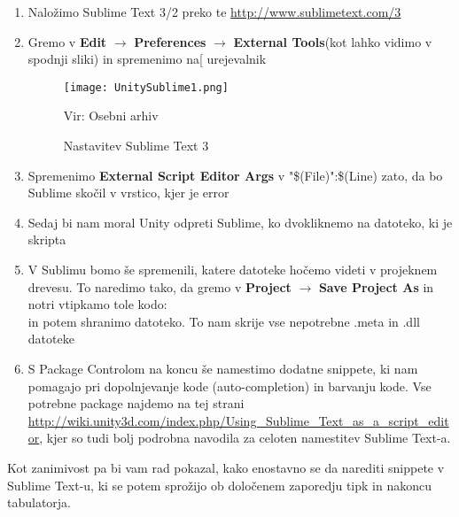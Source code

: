 \begin{enumerate}
	\item Naložimo Sublime Text 3/2 preko te \url{http://www.sublimetext.com/3}
	\item Gremo v \textbf{Edit} $\rightarrow$ \textbf{Preferences} $\rightarrow$ \textbf{External Tools}(kot lahko vidimo v spodnji sliki) in spremenimo na[ urejevalnik\\
	\begin{figure}[ht!]
  		\centering
		\texttt{[image: UnitySublime1.png]}
		\caption{Nastavitev Sublime Text 3}
		{\tiny Vir: Osebni arhiv}
	\end{figure}
	\item Spremenimo \textbf{External Script Editor Args} v "\$(File)":\$(Line) zato, da bo Sublime skočil v vrstico, kjer je error 
	\item Sedaj bi nam moral Unity odpreti Sublime, ko dvokliknemo na datoteko, ki je skripta
	\item V Sublimu bomo še spremenili, katere datoteke hočemo videti v projeknem drevesu. To naredimo tako, da gremo v \textbf{Project} $\rightarrow$ \textbf{Save Project As} in notri vtipkamo tole kodo:\\
	in potem shranimo datoteko. To nam skrije vse nepotrebne .meta in .dll datoteke
	\item S Package Controlom na koncu še namestimo dodatne snippete, ki nam pomagajo pri dopolnjevanje kode (auto-completion) in barvanju kode. Vse potrebne package najdemo na tej strani \url{http://wiki.unity3d.com/index.php/Using_Sublime_Text_as_a_script_editor}, kjer so tudi bolj podrobna navodila za celoten namestitev Sublime Text-a.
\end{enumerate}
Kot zanimivost pa bi vam rad pokazal, kako enostavno se da narediti snippete v Sublime Text-u, ki se potem sprožijo ob določenem zaporedju tipk in nakoncu tabulatorja. 
